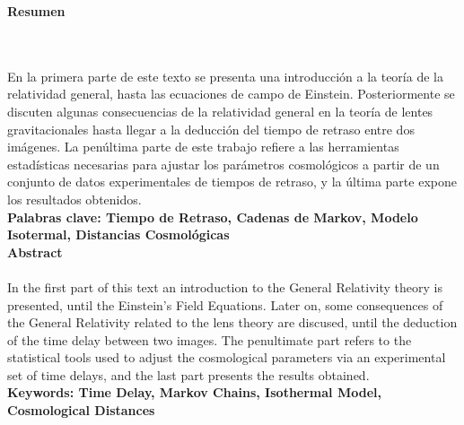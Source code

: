 \textbf{\LARGE Resumen}
\\\\
En la primera parte de este texto se presenta una introducción a la teoría de la relatividad general, hasta las ecuaciones de campo de Einstein. Posteriormente se discuten algunas consecuencias de la relatividad general en la teoría de lentes gravitacionales hasta llegar a la deducción del tiempo de retraso entre dos imágenes. La penúltima parte de este trabajo refiere a las herramientas estadísticas necesarias para ajustar los parámetros cosmológicos a partir de un conjunto de datos experimentales de tiempos de retraso, y la última parte expone los resultados obtenidos. \\[2.0cm]
\textbf{\small Palabras clave: Tiempo de Retraso, Cadenas de Markov, Modelo Isotermal, Distancias Cosmológicas}\\[1.0cm]
\textbf{\LARGE Abstract}\\\\
In the first part of this text an introduction to the General Relativity theory is presented, until the Einstein's Field Equations. Later on, some consequences of the General Relativity related to the lens theory are discused, until the deduction of the time delay between two images. The penultimate part refers to the statistical tools used to adjust the cosmological parameters via an experimental set of time delays, and the last part presents the results obtained.\\[2.0cm]
\textbf{\small Keywords: Time Delay, Markov Chains, Isothermal Model, Cosmological Distances}\\[1.0cm]